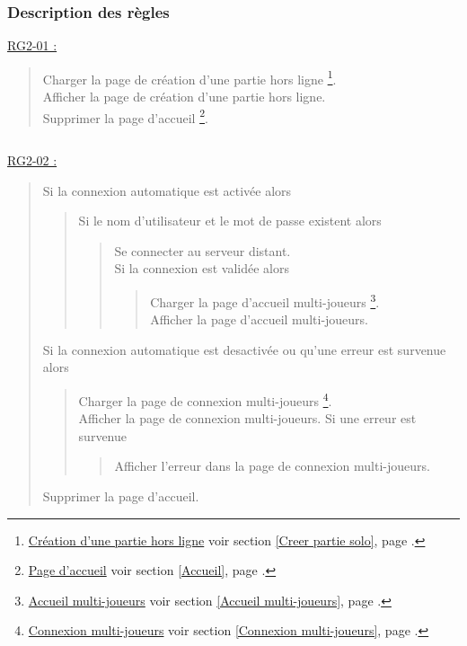 \documentclass{report}
\begin{document}
\newpage

		\subsubsection{Description des règles}
		
		\underline{RG2-01 :}
			\begin{quote}
				Charger la page de création d'une partie hors ligne
					\footnote{
						\hyperlink{Creer partie solo}{Création d'une partie hors ligne}
						\og voir section \ref{Creer partie solo}, page \pageref{Creer partie solo}.\fg
					}.\\
				Afficher la page de création d'une partie hors ligne\footnotemark[1].\\
				Supprimer la page d'accueil%
					\footnote{
						\hyperlink{Page d'accueil}{Page d'accueil}
						\og voir section \ref{Accueil}, page \pageref{Accueil}.\fg
					}.
			\end{quote}

		$\,$

		\underline{RG2-02 :}
			\begin{quote}
				Si la connexion automatique est activée alors
				\begin{quote}
					Si le nom d'utilisateur et le mot de passe existent alors
					\begin{quote}
						Se connecter au serveur distant.\\
						Si la connexion est validée alors
						\begin{quote}
							Charger la page d'accueil multi-joueurs%
								\footnote{
									\hyperlink{Accueil multi-joueurs}{Accueil multi-joueurs}
									\og voir section \ref{Accueil multi-joueurs}, page \pageref{Accueil multi-joueurs}.\fg
								}.\\
							Afficher la page d'accueil multi-joueurs\footnotemark[3].
						\end{quote}
					\end{quote}	
				\end{quote}
				Si la connexion automatique est desactivée ou qu'une erreur est survenue alors 
				\begin{quote}		
					Charger la page de connexion multi-joueurs%
						\footnote{
							\hyperlink{Connexion multi-joueurs}{Connexion multi-joueurs}
							\og voir section \ref{Connexion multi-joueurs}, page \pageref{Connexion multi-joueurs}.\fg
						}.\\
					Afficher la page de connexion multi-joueurs\footnotemark[4].
					Si une erreur est survenue
					\begin{quote}
						Afficher l'erreur dans la page de connexion multi-joueurs\footnotemark[4].
					\end{quote}
				\end{quote}
				Supprimer la page d'accueil\footnotemark[2].
			\end{quote}
\end{document}
